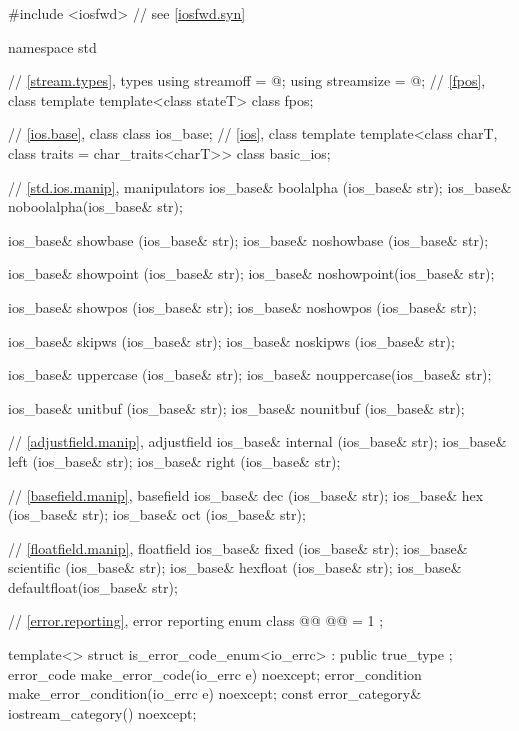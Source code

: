 %
%
\begin{codeblock}
#include <iosfwd>   // see \ref{iosfwd.syn}

namespace std {
  // \ref{stream.types}, types
  using streamoff  = @\impdef@;
  using streamsize = @\impdef@;
  // \ref{fpos}, class template 
  template<class stateT> class fpos;

  // \ref{ios.base}, class 
  class ios_base;
  // \ref{ios}, class template 
  template<class charT, class traits = char_traits<charT>>
    class basic_ios;

  // \ref{std.ios.manip}, manipulators
  ios_base& boolalpha  (ios_base& str);
  ios_base& noboolalpha(ios_base& str);

  ios_base& showbase   (ios_base& str);
  ios_base& noshowbase (ios_base& str);

  ios_base& showpoint  (ios_base& str);
  ios_base& noshowpoint(ios_base& str);

  ios_base& showpos    (ios_base& str);
  ios_base& noshowpos  (ios_base& str);

  ios_base& skipws     (ios_base& str);
  ios_base& noskipws   (ios_base& str);

  ios_base& uppercase  (ios_base& str);
  ios_base& nouppercase(ios_base& str);

  ios_base& unitbuf    (ios_base& str);
  ios_base& nounitbuf  (ios_base& str);

  // \ref{adjustfield.manip}, adjustfield
  ios_base& internal   (ios_base& str);
  ios_base& left       (ios_base& str);
  ios_base& right      (ios_base& str);

  // \ref{basefield.manip}, basefield
  ios_base& dec        (ios_base& str);
  ios_base& hex        (ios_base& str);
  ios_base& oct        (ios_base& str);

  // \ref{floatfield.manip}, floatfield
  ios_base& fixed      (ios_base& str);
  ios_base& scientific (ios_base& str);
  ios_base& hexfloat   (ios_base& str);
  ios_base& defaultfloat(ios_base& str);

  // \ref{error.reporting}, error reporting
  enum class @@ {
    @@ = 1
  };

  template<> struct is_error_code_enum<io_errc> : public true_type { };
  error_code make_error_code(io_errc e) noexcept;
  error_condition make_error_condition(io_errc e) noexcept;
  const error_category& iostream_category() noexcept;
}
\end{codeblock}
%
%
%
%
%

